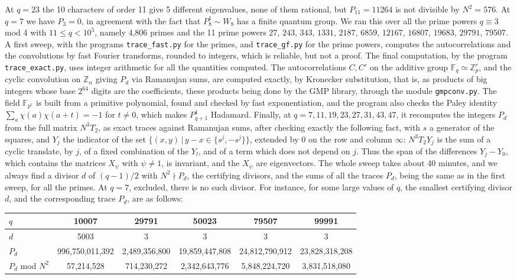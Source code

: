 \documentclass[11pt]{amsart}
\begin{document}
\noindent At $q=23$ the 10 characters of order 11 give 5 different eigenvalues, none of them rational, but $P_{11}=11264$ is not divisible by $N^2=576$. At $q=7$ we have $P_3=0$, in agreement with the fact that $P_8^1\sim W_8$ has a finite quantum group. We ran this over all the prime powers $q\equiv3$ mod 4 with $11\leq q<10^5$, namely 4,806 primes and the 11 prime powers $27$, $243$, $343$, $1331$, $2187$, $6859$, $12167$, $16807$, $19683$, $29791$, $79507$. A first sweep, with the programs \texttt{trace\_fast.py} for the primes, and \texttt{trace\_gf.py} for the prime powers, computes the autocorrelations and the convolutions by fast Fourier transforms, rounded to integers, which is reliable, but not a proof. The final computation, by the program \texttt{trace\_exact.py}, uses integer arithmetic for all the quantities computed. The autocorrelations $C,C'$ on the additive group $\mathbb F_q\simeq\mathbb Z_p^r$, and the cyclic convolution on $\mathbb Z_n$ giving $P_d$ via Ramanujan sums, are computed exactly, by Kronecker substitution, that is, as products of big integers whose base $2^{64}$ digits are the coefficients, these products being done by the GMP library, through the module \texttt{gmpconv.py}. The field $\mathbb F_{p^r}$ is built from a primitive polynomial, found and checked by fast exponentiation, and the program also checks the Paley identity $\sum_a\chi(a)\chi(a+t)=-1$ for $t\neq0$, which makes $P^1_{q+1}$ Hadamard. Finally, at $q=7,11,19,23,27,31,43,47$, it recomputes the integers $P_d$ from the full matrix $N^3T_2$, as exact traces against Ramanujan sums, after checking exactly the following fact, with $s$ a generator of the squares, and $Y_j$ the indicator of the set $\{(x,y)\,|\,y-x\in\{s^j,-s^j\}\}$, extended by 0 on the row and column $\infty$: $N^3T_2Y_j$ is the sum of a cyclic translate, by $j$, of a fixed combination of the $Y_l$, and of a term which does not depend on $j$. Thus the span of the differences $Y_j-Y_0$, which contains the matrices $X_\psi$ with $\psi\neq1$, is invariant, and the $X_\psi$ are eigenvectors. The whole sweep takes about 40 minutes, and we always find a divisor $d$ of $(q-1)/2$ with $N^2\nmid P_d$, the certifying divisors, and the sums of all the traces $P_d$, being the same as in the first sweep, for all the primes. At $q=7$, excluded, there is no such divisor. For instance, for some large values of $q$, the smallest certifying divisor $d$, and the corresponding trace $P_d$, are as follows:

\medskip

\begin{center}
\small
\begin{tabular}{lccccc}
\toprule
$q$ & 10007 & 29791 & 50023 & 79507 & 99991\\
\midrule
$d$ & 5003 & 3 & 3 & 3 & 3\\
$P_d$ & 996,750,011,392 & 2,489,356,800 & 19,859,447,808 & 24,812,790,912 & 23,828,318,208\\
$P_d$ mod $N^2$ & 57,214,528 & 714,230,272 & 2,342,643,776 & 5,848,224,720 & 3,831,518,080\\
\bottomrule
\end{tabular}
\end{center}
\end{document}
